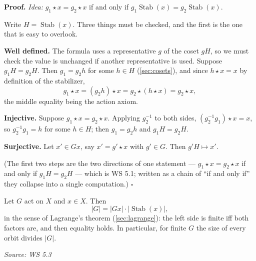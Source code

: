 \documentclass[11pt]{report}
\renewenvironment{proof}[1][Proof]{\noindent\textbf{#1.} }{\hfill$\square$\par\vspace{5pt}}
\newcommand{\srcline}[1]{\par\hfill{\footnotesize\textit{Source: #1}}}
\begin{document}
\begin{proof}
\textit{Idea:} $g_1 \star x = g_2 \star x$ if and only if $g_1\operatorname{Stab}(x) = g_2\operatorname{Stab}(x)$.\par
Write $H = \operatorname{Stab}(x)$. Three things must be checked, and the first is the one that is easy to overlook.

\textbf{Well defined.} The formula uses a representative $g$ of the coset $gH$, so we must check the value is unchanged if another representative is used. Suppose $g_1 H = g_2 H$. Then $g_1 = g_2 h$ for some $h \in H$ (\ref{sec:cosets}), and since $h \star x = x$ by definition of the stabilizer,
\[ g_1 \star x = (g_2 h) \star x = g_2 \star (h \star x) = g_2 \star x, \]
the middle equality being the action axiom.

\textbf{Injective.} Suppose $g_1 \star x = g_2 \star x$. Applying $g_2^{-1}$ to both sides, $(g_2^{-1}g_1) \star x = x$, so $g_2^{-1}g_1 = h$ for some $h \in H$; then $g_1 = g_2 h$ and $g_1 H = g_2 H$.

\textbf{Surjective.} Let $x' \in Gx$, say $x' = g' \star x$ with $g' \in G$. Then $g'H \mapsto x'$.

(The first two steps are the two directions of one statement --- $g_1 \star x = g_2 \star x$ if and only if $g_1H = g_2H$ --- which is WS 5.1; written as a chain of ``if and only if'' they collapse into a single computation.)
\end{proof}

\begin{center}
\label{fig:orbit-bijection}
\end{center}


\begin{thmbox}\label{thm:orbit-stabilizer}
Let $G$ act on $X$ and $x \in X$. Then
\[ |G| = |Gx| \cdot |\operatorname{Stab}(x)|, \]
in the sense of Lagrange's theorem (\ref{sec:lagrange}): the left side is finite iff both factors are, and then equality holds. In particular, for finite $G$ the size of every orbit divides $|G|$.
\srcline{WS 5.3}
\end{thmbox}
\end{document}
